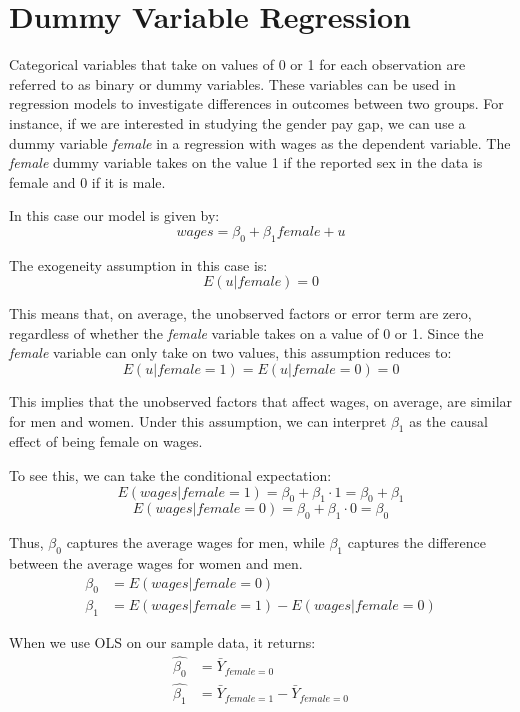 \documentclass{./../../Latex/handout}
\begin{document}
\thispagestyle{plain}

\vspace{-1cm}
\section{Dummy Variable Regression}

Categorical variables that take on values of 0 or 1 for each observation are referred to as binary or dummy variables. These variables can be used in regression models to investigate differences in outcomes between two groups. For instance, if we are interested in studying the gender pay gap, we can use a dummy variable \textit{female} in a regression with wages as the dependent variable. The \textit{female} dummy variable takes on the value 1 if the reported sex in the data is female and 0 if it is male.

In this case our model is given by:
$$ wages = \beta_0 + \beta_1 female + u  $$

The exogeneity assumption in this case is:
$$ E(u | female) =0 $$

This means that, on average, the unobserved factors or error term are zero, regardless of whether the \textit{female} variable takes on a value of 0 or 1. Since the \textit{female} variable can only take on two values, this assumption reduces to:
$$ E(u | female=1) =E(u | female=0) = 0 $$

This implies that the unobserved factors that affect wages, on average, are similar for men and women. Under this assumption, we can interpret $\beta_1$ as the causal effect of being female on wages.

To see this, we can take the conditional expectation:
$$ E(wages | female=1) = \beta_0 + \beta_1 \cdot 1  = \beta_0 + \beta_1 $$
$$ E(wages | female=0) = \beta_0 + \beta_1 \cdot 0 = \beta_0   $$

Thus, $\beta_0$ captures the average wages for men, while $\beta_1$ captures the difference between the average wages for women and men.
\begin{align*}
\beta_0 & = E(wages | female=0) \\
\beta_1 &= E(wages | female=1)-E(wages | female=0)
\end{align*}

When we use OLS on our sample data, it returns:
\begin{align*}
\hat{\beta_0} & = \bar{Y}_{female=0} \\
\hat{\beta_1} & =  \bar{Y}_{female=1}-\bar{Y}_{female=0}
\end{align*}
\end{document}
